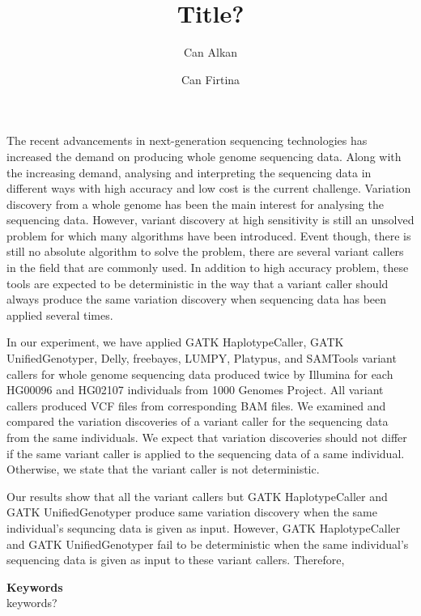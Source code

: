 \documentclass[a4paper]{article}
\date{}
\def\keywords#1{\begin{center}{\bf Keywords}\\{#1}\end{center}}
\def\titulo#1{\title{#1}}
\begin{document}
\titulo{Title?}

\author[1]{Can Alkan}
\author[1]{Can Firtina}

\maketitle
The recent advancements in next-generation sequencing technologies has increased the demand on producing whole genome sequencing data. Along with the increasing demand, analysing and interpreting the sequencing data in different ways with high accuracy and low cost is the current challenge. Variation discovery from a whole genome has been the main interest for analysing the sequencing data. However, variant discovery at high sensitivity is still an unsolved problem for which many algorithms have been introduced. Event though, there is still no absolute algorithm to solve the problem, there are several variant callers in the field that are commonly used. In addition to high accuracy problem,  these tools are expected to be deterministic in the way that a variant caller should always produce the same variation discovery when sequencing data has been applied several times.

In our experiment, we have applied GATK HaplotypeCaller, GATK UnifiedGenotyper, Delly, freebayes, LUMPY, Platypus, and SAMTools variant callers for whole genome sequencing data produced twice by Illumina for each HG00096 and HG02107 individuals from 1000 Genomes Project. All variant callers produced VCF files from corresponding BAM files. We examined and compared the variation discoveries of a variant caller for the sequencing data from the same individuals. We expect that variation discoveries should not differ if the same variant caller is applied to the sequencing data of a same individual. Otherwise, we state that the variant caller is not deterministic.

Our results show that all the variant callers but GATK HaplotypeCaller and GATK UnifiedGenotyper produce same variation discovery when the same individual's sequncing data is given as input. However, GATK HaplotypeCaller and GATK UnifiedGenotyper fail to be deterministic when the same individual's sequencing data is given as input to these variant callers.  Therefore,
\thispagestyle{empty}


\begin{abstract}

\end{abstract}

\keywords{keywords?} %
\end{document}
